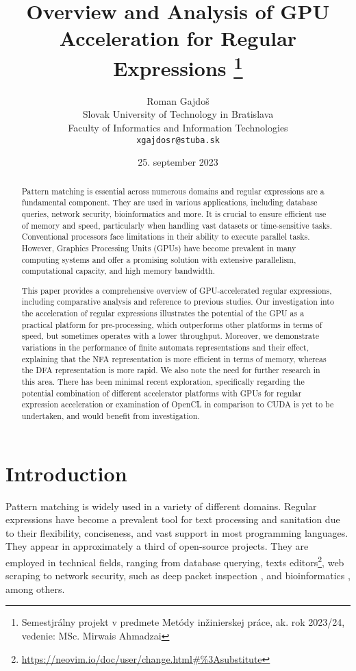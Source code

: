 \documentclass[10pt,onecolumn,twoside,english,a4paper]{article}
\title{Overview and Analysis of GPU Acceleration for Regular Expressions
\thanks{Semestjrálny projekt v predmete Metódy inžinierskej práce, ak. rok 2023/24, vedenie: MSc. Mirwais Ahmadzai}} %
\author{Roman Gajdoš\\[2pt]
	{\small Slovak University of Technology in Bratislava}\\
	{\small Faculty of Informatics and Information Technologies}\\
	{\small \texttt{xgajdosr@stuba.sk}}
	}
\date{\small 25. september 2023} %
\begin{document}
\maketitle

\begin{abstract}
  Pattern matching is essential across numerous domains and regular expressions are a fundamental component. They are used in various applications, including database queries, network security, bioinformatics and more. It is crucial to ensure efficient use of memory and speed, particularly when handling vast datasets or time-sensitive tasks.
  Conventional processors face limitations in their ability to execute parallel tasks. However, Graphics Processing Units (GPUs) have become prevalent in many computing systems and offer a promising solution with extensive parallelism, computational capacity, and high memory bandwidth.

  This paper provides a comprehensive overview of GPU-accelerated regular expressions, including comparative analysis and reference to previous studies. Our investigation into the acceleration of regular expressions illustrates the potential of the GPU as a practical platform for pre-processing, which outperforms other platforms in terms of speed, but sometimes operates with a lower throughput. Moreover, we demonstrate variations in the performance of finite automata representations and their effect, explaining that the NFA representation is more efficient in terms of memory, whereas the DFA representation is more rapid. We also note the need for further research in this area. There has been minimal recent exploration, specifically regarding the potential combination of different accelerator platforms with GPUs for regular expression acceleration or examination of OpenCL in comparison to CUDA is yet to be undertaken, and would benefit from investigation.

\end{abstract}

\section{Introduction} \label{Introduction}
Pattern matching is widely used in a variety of different domains. Regular expressions have become a prevalent tool for text processing and sanitation due to their flexibility, conciseness, and vast support in most programming languages\cite{Chapman:Usage}. They appear in approximately a third of open-source projects\cite{Davis:Re-use}. They are employed in technical fields, ranging from database querying\cite{István:databases-regex}, texts editors\footnote{\url{https://neovim.io/doc/user/change.html\#\%3Asubstitute}}, web scraping \cite{Gunawan2019/03} to network security, such as deep packet inspection \cite{becchi2008workload}, and bioinformatics \cite{huang2008gpu}, among others.
\end{document}
